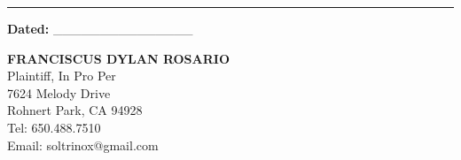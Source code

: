 \begin{center}\rule{0.5\linewidth}{0.5pt}\end{center}

\textbf{Dated:} \_\_\_\_\_\_\_\_\_\_\_\_\_\_\_

\textbf{FRANCISCUS DYLAN ROSARIO}\\
Plaintiff, In Pro Per\\
7624 Melody Drive\\
Rohnert Park, CA 94928\\
Tel: 650.488.7510\\
Email: soltrinox@gmail.com

\nolinenumbers



